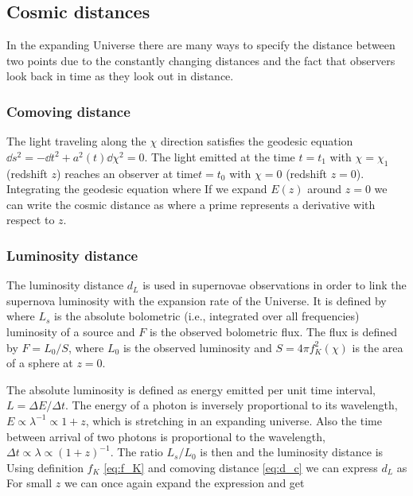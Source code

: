\subsection{Cosmic distances}

In the expanding Universe there are many ways to specify the distance between two points due to the constantly changing distances and the fact that observers look back in time as they look out in distance.
\subsubsection{Comoving distance}
The light traveling along the $\chi$ direction satisfies the geodesic equation $\dd s^2=-\dd t^2+a^2(t)\dd \chi^2=0$. The light emitted at the time $t=t_1$ with $\chi=\chi_1$ (redshift $z$) reaches an observer at time$t=t_0$ with $\chi=0$ (redshift $z=0$). Integrating the geodesic equation
where
If we expand $E(z)$ around $z=0$ we can write the cosmic distance as
where a prime represents a derivative with respect to $z$.
\subsubsection{Luminosity distance}
The luminosity distance $d_L$ is used in supernovae observations in order to link the supernova luminosity with the expansion rate of the Universe. It is defined by
where $L_s$ is the absolute bolometric (i.e., integrated over all frequencies) luminosity of a source and $F$ is the observed bolometric flux. The flux is defined by $F=L_0/S$, where $L_0$ is the observed luminosity and $S=4\pi f_K^2(\chi)$ is the area of a sphere at $z=0$.

The absolute luminosity is defined as energy emitted per unit time interval, $L=\Delta E/\Delta t$. The energy of a photon is inversely proportional to its wavelength, $E\propto\lambda^{-1}\propto 1+z$, which is stretching in an expanding universe. Also the time between arrival of two photons is proportional to the wavelength, $\Delta t\propto\lambda\propto(1+z)^{-1}$. The ratio $L_s/L_0$ is then
and the luminosity distance is
Using definition \(f_K\) \eqref{eq:f_K} and comoving distance \eqref{eq:d_c} we can express $d_L$ as
For small $z$ we can once again expand the expression and get
